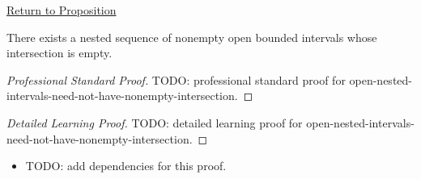 \newpage
{}
\label{prf:open-nested-intervals-need-not-have-nonempty-intersection}

\begin{remark*}[Return]
\hyperref[prop:open-nested-intervals-need-not-have-nonempty-intersection]{Return to Proposition}
\end{remark*}

\begin{proposition*}
There exists a nested sequence of nonempty open bounded intervals whose
intersection is empty.
\end{proposition*}

\begin{proof}[Professional Standard Proof]
\LRAProofBodyStart
TODO: professional standard proof for open-nested-intervals-need-not-have-nonempty-intersection.
\end{proof}

\begin{proof}[Detailed Learning Proof]
\LRAProofBodyStart
TODO: detailed learning proof for open-nested-intervals-need-not-have-nonempty-intersection.
\end{proof}

\begin{remark*}
\end{remark*}

\begin{dependencies}
\begin{itemize}
  \item TODO: add dependencies for this proof.
\end{itemize}
\end{dependencies}

\clearpage
